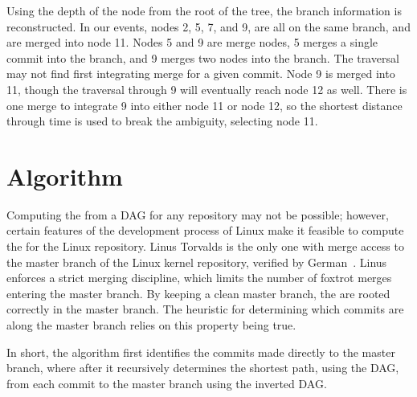 Using the depth of the node from the root of the tree, the branch
information is reconstructed. In our events, nodes 2, 5, 7, and 9, are
all on the same branch, and are merged into node 11. Nodes 5 and 9 are
merge nodes, 5 merges a single commit into the branch, and 9 merges two
nodes into the branch.
The traversal may not find first integrating merge for a given commit.
Node 9 is merged into 11, though the traversal through 9 will eventually
reach node 12 as well.
There is one merge to integrate 9 into either node 11 or node 12, so the
shortest distance through time is used to break the ambiguity, selecting
node 11.

\section{Algorithm}
\label{sec:algorithm}

Computing the \mt from a DAG for any repository may not be possible;
however, certain features of the development process of Linux make it
feasible to compute the \mt for the Linux repository.
Linus Torvalds is the only one with merge access to the master branch of
the Linux kernel repository, verified by German~\cite{German2015}.
Linus enforces a strict merging discipline, which limits the number of
foxtrot merges entering the master branch.
By keeping a clean master branch, the  are rooted correctly in
the master branch.
The heuristic for determining which commits are along the master branch
relies on this property being true.

In short, the algorithm first
identifies the commits made directly to the master branch, where after
it recursively determines the shortest path, using the DAG, from each
commit to the master branch using the inverted DAG\@.

